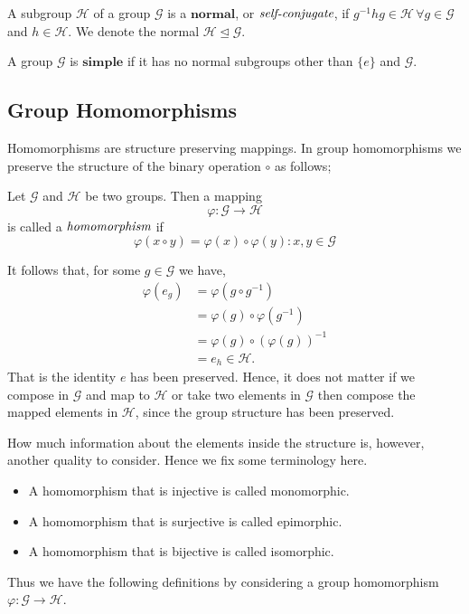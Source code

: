 \begin{defn}
	A subgroup $\mathcal{H}$ of a group $\mathcal{G}$ is a $\textbf{normal}$, or $\emph{self-conjugate}$, if
	$g^{-1} h g \in \mathcal{H} \, \forall g \in \mathcal{G}$ and $h \in \mathcal{H}$. We denote the normal
	$\mathcal{H} \unlhd \mathcal{G}$.
\end{defn}

\begin{defn}
	A group $\mathcal{G}$ is $\textbf{simple}$ if it has no normal subgroups other than $\{e\}$ and $\mathcal{G}$.
\end{defn}

\subsection{Group Homomorphisms} %
\label{subsec:homomorphisms}
Homomorphisms are structure preserving mappings. In group homomorphisms we preserve the structure of
the binary operation $\circ$ as follows;
\begin{defn}[Homomorphism]
	Let $\mathcal{G}$ and $\mathcal{H}$ be two groups. Then a mapping
	\[
		\varphi : \mathcal{G} \to \mathcal{H}
	\]
	is called a $\emph{homomorphism}$ if
	\[
		\varphi(x \circ y) = \varphi(x) \circ \varphi(y) : x,y \in \mathcal{G}
	\]
\end{defn}
It follows that, for some $g \in \mathcal{G}$ we have,
\begin{align*}
	\varphi ( e_g ) &= \varphi (g \circ g^{-1})
	\\
	&= \varphi (g) \circ \varphi (g^{-1})
	\\
	&= \varphi (g) \circ (\varphi (g) )^{-1}
	\\
	&= e_h \in \mathcal{H}.
\end{align*}
That is the identity $e$ has been preserved.
Hence, it does not matter if we compose in $\mathcal{G}$ and map to $\mathcal{H}$ or take two elements in $\mathcal{G}$
then compose the mapped elements in $\mathcal{H}$, since the group structure has been preserved.

How much information about the elements inside the structure is, however, another quality to consider. Hence we fix some
terminology here.
\begin{itemize}
	\item A homomorphism that is injective is called monomorphic.
	\item A homomorphism that is surjective is called epimorphic.
	\item A homomorphism that is bijective is called isomorphic.
\end{itemize}
Thus we have the following definitions by considering a group homomorphism $\varphi : \mathcal{G} \to \mathcal{H}$.


